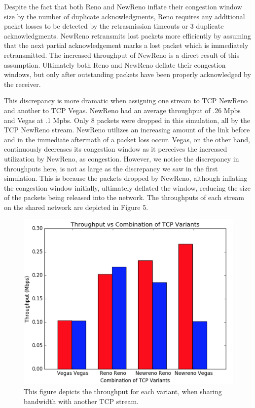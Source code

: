 Despite the fact that both Reno and NewReno inflate their congestion window size by the number of duplicate acknowledgments, Reno requires any additional packet losses to be detected by the retrasmission timeouts or 3 duplicate acknowledgments. NewReno retransmits lost packets more efficiently by assuming that the next partial acknowledgement marks a lost packet which is immediately retransmitted. The increased throughput of NewReno is a direct result of this assumption. Ultimately both Reno and NewReno deflate their congestion windows, but only after outstanding packets have been properly acknowledged by the receiver.

This discrepancy is more dramatic when assigning one stream to TCP NewReno and another to TCP Vegas. NewReno had an average throughput of .26 Mpbs and Vegas at .1 Mpbs. Only 8 packets were dropped in this simulation, all by the TCP NewReno stream. NewReno utilizes an increasing amount of the link before and in the immediate aftermath of a packet loss occur. Vegas, on the other hand, continuously decreases its congestion window as it perceives the increased utilization by NewReno, as congestion. However, we notice the discrepancy in throughputs here, is not as large as the discrepancy we saw in the first simulation. This is because the packets dropped by NewReno, although inflating the congestion window initially, ultimately deflated the window, reducing the size of the packets being released into the network. The throughputs of each stream on the shared network are depicted in Figure 5.

\begin{figure}[!htbp]
	\includegraphics[scale=0.3]{exp2_tp.png}
	\caption{This figure depicts the throughput for each variant, when sharing bandwidth with another TCP stream.}
	\label{a:label}
\end{figure}




